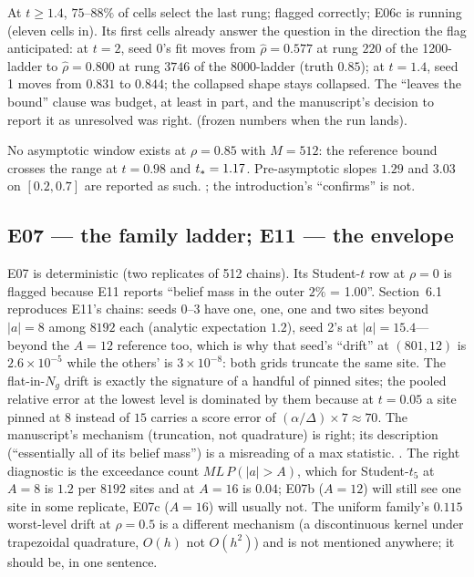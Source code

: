  At $t\ge1.4$, $75$--$88\%$ of cells select the last rung; flagged correctly; E06c is running (eleven cells in). Its first cells already answer the question in the direction the flag anticipated: at $t=2$, seed 0's fit moves from $\hat\rho=0.577$ at rung $220$ of the 1200-ladder to $\hat\rho=0.800$ at rung $3746$ of the 8000-ladder (truth $0.85$); at $t=1.4$, seed 1 moves from $0.831$ to $0.844$; the collapsed shape stays collapsed. The ``leaves the bound'' clause was budget, at least in part, and the manuscript's decision to report it as unresolved was right.  (frozen numbers when the run lands).

 No asymptotic window exists at $\rho=0.85$ with $M=512$: the reference bound crosses the range at $t=0.98$ and $t_\ast=1.17$. Pre-asymptotic slopes $1.29$ and $3.03$ on $[0.2,0.7]$ are reported as such. ; the introduction's ``confirms'' is not.

\subsection{E07 --- the family ladder; E11 --- the envelope}
E07 is deterministic (two replicates of 512 chains). Its Student-$t$ row at $\rho=0$ is flagged because E11 reports ``belief mass in the outer $2\%$ = 1.00''. Section~6.1 reproduces E11's chains: seeds 0--3 have one, one, one and two sites beyond $|a|=8$ among $8192$ each (analytic expectation $1.2$), seed 2's at $|a|=15.4$---beyond the $A=12$ reference too, which is why that seed's ``drift'' at $(801,12)$ is $2.6\times10^{-5}$ while the others' is $3\times10^{-8}$: both grids truncate the same site. The flat-in-$N_g$ drift is exactly the signature of a handful of pinned sites; the pooled relative error at the lowest level is dominated by them because at $t=0.05$ a site pinned at $8$ instead of $15$ carries a score error of $(\alpha/\Delta)\times7\approx70$. The manuscript's mechanism (truncation, not quadrature) is right; its description (``essentially all of its belief mass'') is a misreading of a max statistic. . The right diagnostic is the exceedance count $M L\,P(|a|>A)$, which for Student-$t_5$ at $A=8$ is $1.2$ per $8192$ sites and at $A=16$ is $0.04$; E07b ($A=12$) will still see one site in some replicate, E07c ($A=16$) will usually not. The uniform family's $0.115$ worst-level drift at $\rho=0.5$ is a different mechanism (a discontinuous kernel under trapezoidal quadrature, $O(h)$ not $O(h^2)$) and is not mentioned anywhere; it should be, in one sentence.

